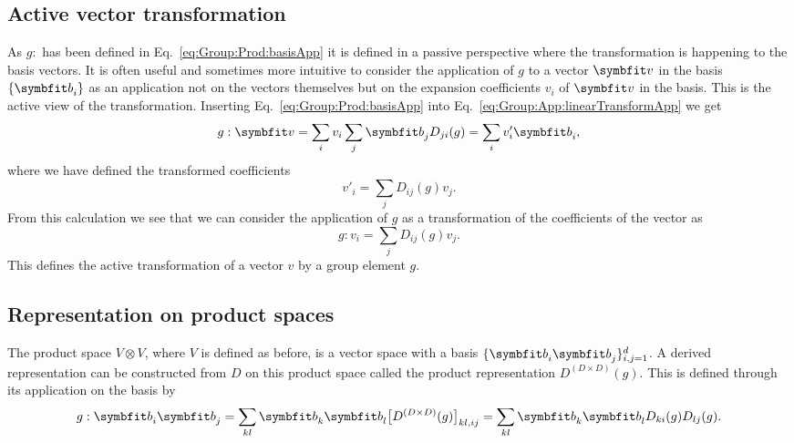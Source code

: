 \subsection{Active vector transformation}

As $g:$ has been defined in Eq.~\eqref{eq:Group:Prod:basisApp} it is defined in a passive perspective where the transformation is happening
to the basis vectors. It is often useful and sometimes more intuitive to consider
the application of $g$ to a vector $\v{v}$ in the basis $\{\v{b}_i\}$ as an application not
on the vectors themselves but on the expansion coefficients $v_i$ of $\v{v}$ in the basis. This is the active view of the transformation.
Inserting Eq.~\eqref{eq:Group:Prod:basisApp} into Eq.~\eqref{eq:Group:App:linearTransformApp} we get
\begin{equation}
    \label{eq:Group:App:activeTransform}
        g:\v{v} = \sum_iv_i\sum_j\v{b}_jD_{ji}(g) = \sum_iv'_i\v{b}_i,
\end{equation}
where we have defined the transformed coefficients
\begin{equation}
    \label{eq:Group:App:transformedCoeff}
    v'_i = \sum_jD_{ij}(g)v_j.
\end{equation}
From this calculation we see that we can consider the application of $g$ as a transformation of the coefficients of the vector as
\begin{equation}
    \label{eq:Group:App:coeffTransformation}
    g:v_i = \sum_jD_{ij}(g)v_j.
\end{equation}
This defines the active transformation of a vector $v$ by a group element $g$.

\subsection{Representation on product spaces}

The product space $V\otimes V$, where $V$ is defined as before, is a vector space with a basis $\{\v{b}_i\v{b}_j\}_{i,j=1}^d$. A derived representation can be constructed from $D$ on this product space
called the product representation $D^{(D\times D)}(g)$. This is defined through its application on the basis by
\begin{equation}
    \label{eq:Group:Prod:prodBasisApp}
    g:\v{b}_i\v{b}_j = \sum_{kl}\v{b}_k\v{b}_l\big[D^{(D\times D)}(g)\big]_{kl,ij} = \sum_{kl}\v{b}_k\v{b}_lD_{ki}(g)D_{lj}(g).
\end{equation}

